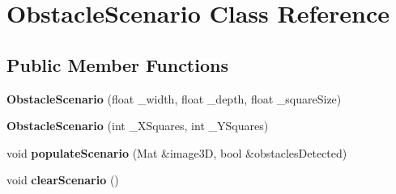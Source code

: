 \hypertarget{class_obstacle_scenario}{}\section{Obstacle\+Scenario Class Reference}
\label{class_obstacle_scenario}
\subsection*{Public Member Functions}
\begin{DoxyCompactItemize}
\item 
{\bfseries Obstacle\+Scenario} (float \+\_\+width, float \+\_\+depth, float \+\_\+square\+Size)\hypertarget{class_obstacle_scenario_a5bfca54e556b84c37db4161ab4d12733}{}\label{class_obstacle_scenario_a5bfca54e556b84c37db4161ab4d12733}

\item 
{\bfseries Obstacle\+Scenario} (int \+\_\+\+X\+Squares, int \+\_\+\+Y\+Squares)\hypertarget{class_obstacle_scenario_a3779067f903fb12688a0acbe26cfa079}{}\label{class_obstacle_scenario_a3779067f903fb12688a0acbe26cfa079}

\item 
void {\bfseries populate\+Scenario} (Mat \&image3D, bool \&obstacles\+Detected)\hypertarget{class_obstacle_scenario_a608d6d230f3a0e092a66838e3e7b712e}{}\label{class_obstacle_scenario_a608d6d230f3a0e092a66838e3e7b712e}

\item 
void {\bfseries clear\+Scenario} ()\hypertarget{class_obstacle_scenario_ad4f97407fa1c8b30cf41e4fc1773a884}{}\label{class_obstacle_scenario_ad4f97407fa1c8b30cf41e4fc1773a884}

\end{DoxyCompactItemize}
